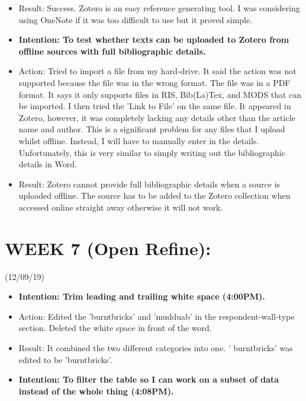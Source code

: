 \documentclass[a4paper,12pt]{article}
\begin{document}
\begin{itemize}
\begin{itemize}
\item Result: Success. Zotero is an easy reference generating tool. I was considering using OneNote if it was too difficult to use but it proved simple.  
    
\item \textbf{Intention: To test whether texts can be uploaded to Zotero from offline sources with full bibliographic details.}

\item Action: Tried to import a file from my hard-drive. It said the action was not supported because the file was in the wrong format. The file was in a PDF format. It says it only supports files in RIS, Bib(La)Tex, and MODS that can be imported. I then tried the 'Link to File' on the same file. It appeared in Zotero, however, it was completely lacking any details other than the article name and author. This is a significant problem for any files that I upload whilst offline. Instead, I will have to manually enter in the details. Unfortunately, this is very similar to simply writing out the bibliographic details in Word. 

\item Result: Zotero cannot provide full bibliographic details when a source is uploaded offline. The source has to be added to the Zotero collection when accessed online straight away otherwise it will not work.

\end{itemize}


\section{WEEK 7 (Open Refine):}

(12/09/19)

\begin{itemize} 

\item \textbf{Intention: Trim leading and trailing white space (4:00PM).}

\item Action: Edited the 'burntbricks' and 'mudduab' in the respondent-wall-type section. Deleted the white space in front of the word. 

\item Result: It combined the two different categories into one. ' burntbricks' was edited to be 'burntbricks'. 

\item \textbf{Intention: To filter the table so I can work on a subset of data instead of the whole thing (4:08PM).}


\end{itemize}
\end{itemize}
\end{document}

